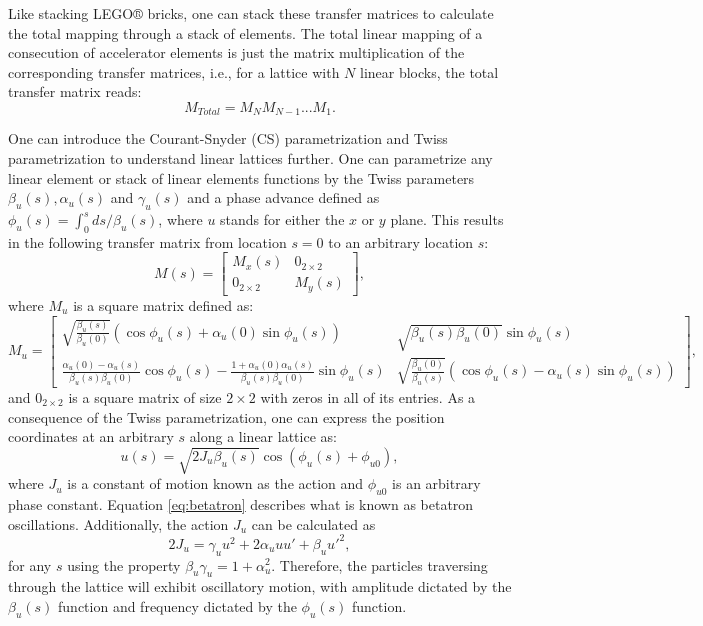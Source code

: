 Like stacking LEGO® bricks, one can stack these transfer matrices to calculate the total mapping through a stack of elements. The total linear mapping of a consecution of accelerator elements is just the matrix multiplication of the corresponding transfer matrices, i.e., for a lattice with $N$ linear blocks, the total transfer matrix reads:
\begin{equation}
    \label{eq:consecution}
    M_{Total}=M_NM_{N-1}...M_1.     
\end{equation}

One can introduce the Courant-Snyder (CS) parametrization and Twiss parametrization to understand linear lattices further. One can parametrize any linear element or stack of linear elements functions by the Twiss parameters $\beta_u(s),\alpha_u(s)$ and $\gamma_u(s)$ and a phase advance defined as $  \phi_u(s)=\int_0^s ds/\beta_u(s)$, where $u$ stands for either the $x$ or $y$ plane. This results in the following transfer matrix from location $s=0$ to an arbitrary location $s$:
\begin{equation}
    \label{eq:twissmatrix}
    M(s)= 
    \begin{bmatrix} 
    M_x(s) & 0_{2 \times 2} \\ 
    0_{2 \times 2} & M_y(s)
    \end{bmatrix},
\end{equation}
where $M_u$ is a square matrix defined as:
\begin{equation}
    \label{eq:mu}
    M_u= 
    \begin{bmatrix} 
    \sqrt{\frac{\beta_u(s)}{\beta_u (0)}}\left( \cos  \phi_u(s) +\alpha_u(0) \sin  \phi_u(s) \right) & \sqrt{\beta_u(s) \beta_u(0)} \sin  \phi_u(s) \\ \frac{\alpha_u(0)-\alpha_u(s)}{\beta_u(s) \beta_u(0)}\cos  \phi_u(s) - \frac{1+\alpha_u(0)\alpha_u(s)}{\beta_u(s) \beta_u(0)} \sin  \phi_u(s) & \sqrt{\frac{\beta_u(0)}{\beta_u (s)}}\left( \cos  \phi_u(s) - \alpha_u(s) \sin  \phi_u(s) \right) 
    \end{bmatrix},
\end{equation}
and $0_{2\times 2}$ is a square matrix of size $2\times 2$ with zeros in all of its entries. As a consequence of the Twiss parametrization, one can express the position coordinates at an arbitrary $s$ along a linear lattice as:
\begin{equation}
    \label{eq:betatron}
    u(s)=\sqrt{2 J_u \beta_u(s)} \cos \left(  \phi_u(s) + \phi_{u0} \right),
\end{equation} 
where $J_u$ is a constant of motion known as the action and $\phi_{u0}$ is an arbitrary phase constant. Equation \ref{eq:betatron} describes what is known as betatron oscillations. Additionally, the action $J_u$ can be calculated as 
\begin{equation}
    \label{eq:ellipse}
    2J_u=\gamma_u u^2 +2\alpha_u u u' +\beta_u u'^2, 
\end{equation}
for any $s$ using the property $\beta_u \gamma_u = 1+\alpha_u^2$. Therefore, the particles traversing through the lattice will exhibit oscillatory motion, with amplitude dictated by the $\beta_u(s)$ function and frequency dictated by the $ \phi_u(s)$ function.

